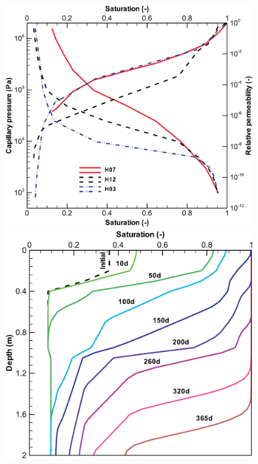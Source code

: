 \begin{figure}[htb!]
\begin{center}
\begin{minipage}[t]{0.45\textwidth}
\begin{center}
      \end{center}
    \end{minipage}\\
  \end{center}
%
  \begin{center}
    \begin{minipage}[t]{0.45\textwidth}
      \begin{center}
        \includegraphics[scale=0.27]{H_US/figures/Soil_P3.eps}
      \end{center}
    \end{minipage}
    \begin{minipage}[t]{0.45\textwidth}
      \begin{center}
        \includegraphics[scale=0.27]{H_US/figures/pl3_s.eps}

\end{center}
\end{minipage}
\end{center}
\end{figure}
